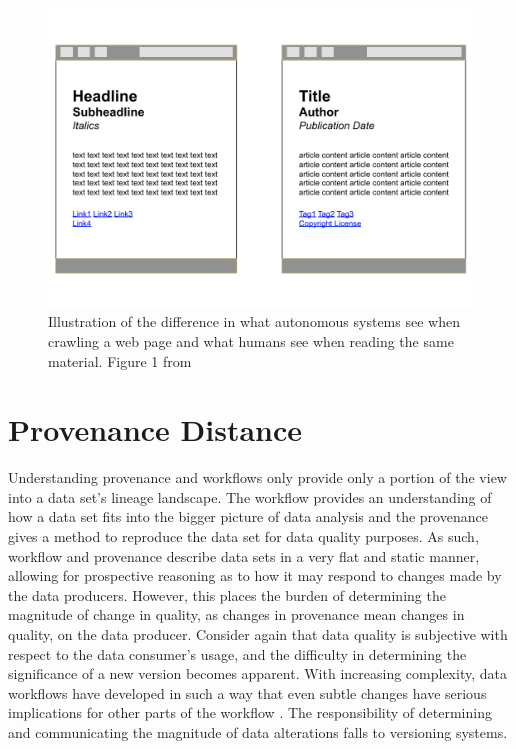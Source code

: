 \begin{figure}
	\centering
	\includegraphics[scale=0.40]{figures/RDFaSemantics.png}
	\caption{Illustration of the difference in what autonomous systems see when crawling a web page and what humans see when reading the same material. Figure 1 from \cite{Herman2015}}
	\label{RDFa}
\end{figure}

\section{Provenance Distance}

Understanding provenance and workflows only provide only a portion of the view into a data set's lineage landscape.
The workflow provides an understanding of how a data set fits into the bigger picture of data analysis and the provenance gives a method to reproduce the data set for data quality purposes.
As such, workflow and provenance describe data sets in a very flat and static manner, allowing for prospective reasoning as to how it may respond to changes made by the data producers.
However, this places the burden of determining the magnitude of change in quality, as changes in provenance mean changes in quality, on the data producer.
Consider again that data quality is subjective with respect to the data consumer's usage, and the difficulty in determining the significance of a new version becomes apparent.
With increasing complexity, data workflows have developed in such a way that even subtle changes have serious implications for other parts of the workflow \cite{TILMES2011548}.
The responsibility of determining and communicating the magnitude of data alterations falls to versioning systems.

